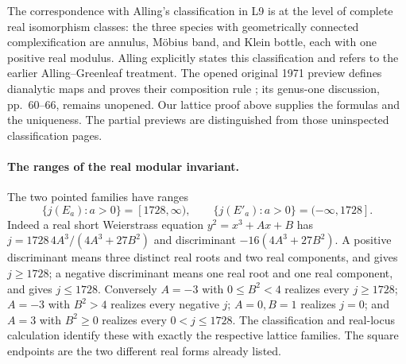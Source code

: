The correspondence with Alling's classification in L9 is at the level of complete real isomorphism classes: the three species with geometrically connected complexification are annulus, M\"obius band, and Klein bottle, each with one positive real modulus. Alling \cite[preface and \S0.10]{Alling1981A567} explicitly states this classification and refers to the earlier Alling--Greenleaf treatment. The opened original 1971 preview defines dianalytic maps and proves their composition rule \cite[pp.~1--2, Proposition 1.1.3]{AllingGreenleaf1971A567}; its genus-one discussion, pp.~60--66, remains unopened. Our lattice proof above supplies the formulas and the uniqueness. The partial previews are distinguished from those uninspected classification pages.

\paragraph{The ranges of the real modular invariant.}
The two pointed families have ranges
\[
 \{j(E_a):a>0\}=[1728,\infty),\qquad
 \{j(E'_a):a>0\}=(-\infty,1728].
\]
Indeed a real short Weierstrass equation $y^2=x^3+Ax+B$ has
$j=1728\,4A^3/(4A^3+27B^2)$ and discriminant
$-16(4A^3+27B^2)$. A positive discriminant means three distinct real roots and two real components, and gives $j\ge1728$; a negative discriminant means one real root and one real component, and gives $j\le1728$. Conversely $A=-3$ with $0\le B^2<4$ realizes every $j\ge1728$; $A=-3$ with $B^2>4$ realizes every negative $j$; $A=0,B=1$ realizes $j=0$; and $A=3$ with $B^2\ge0$ realizes every $0<j\le1728$. The classification and real-locus calculation identify these with exactly the respective lattice families. The square endpoints are the two different real forms already listed.
